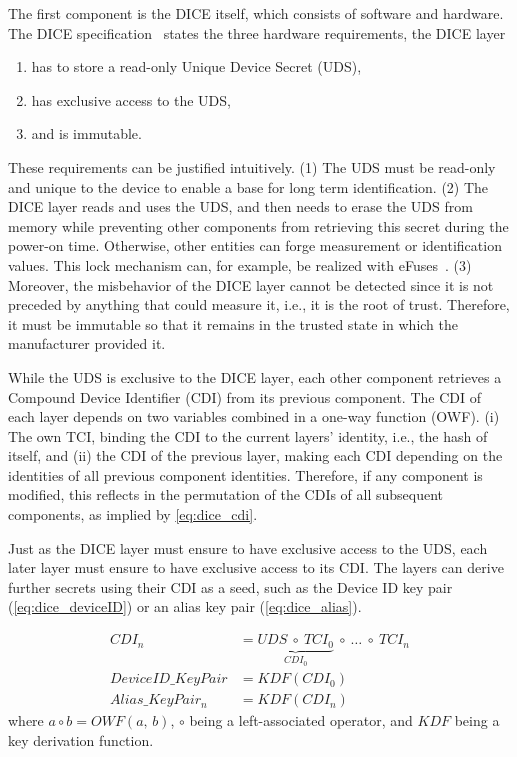 The first component is the DICE itself, which consists of software and hardware. The DICE specification~\cite{dice-hardware-reqs} states the three hardware requirements, the DICE layer 
\begin{enumerate}
  \item has to store a read-only Unique Device Secret (UDS),
  \item has exclusive access to the UDS,
  \item and is immutable.
\end{enumerate}
These requirements can be justified intuitively.
(1) The UDS must be read-only and unique to the device to enable a base for long term identification.
(2) The DICE layer reads and uses the UDS, and then needs to erase the UDS from memory while preventing other components from retrieving this secret during the power-on time.
Otherwise, other entities can forge measurement or identification values. This lock mechanism can, for example, be realized with eFuses~\cite{dice-hardware-reqs}.
(3) Moreover, the misbehavior of the DICE layer cannot be detected since it is not preceded by anything that could measure it, i.e., it is the root of trust.
Therefore, it must be immutable so that it remains in the trusted state in which the manufacturer provided it.


While the UDS is exclusive to the DICE layer, each other component retrieves a Compound Device Identifier (CDI) from its previous component.
The CDI of each layer depends on two variables combined in a one-way function (OWF).
(i) The own TCI, binding the CDI to the current layers' identity, i.e., the hash of itself, and (ii) the CDI of the previous layer, making each CDI depending on the identities of all previous component identities.
Therefore, if any component is modified, this reflects in the permutation of the CDIs of all subsequent components, as implied by \autoref{eq:dice_cdi}.


Just as the DICE layer must ensure to have exclusive access to the UDS, each later layer must ensure to have exclusive access to its CDI\@.
The layers can derive further secrets using their CDI as a seed, such as the Device ID key pair (\autoref{eq:dice_deviceID}) or an alias key pair (\autoref{eq:dice_alias}).

\noindent
\begin{minipage}{\linewidth}
\begin{align}
  \label{eq:dice_cdi}
  CDI_n &= \underbrace{UDS\ \circ\ TCI_0}_{CDI_0}\ \circ\ \ldots\ \circ\ TCI_n\\
  \label{eq:dice_deviceID}
  DeviceID\_KeyPair &= KDF(CDI_0)\\
  \label{eq:dice_alias}
  Alias\_KeyPair_n  &= KDF(CDI_n)
\end{align}
where \(a \circ b = OWF(a,\,b)\), \(\circ\) being a left-associated operator, and \(KDF\) being a key derivation function.
\end{minipage}
\baselineskip

